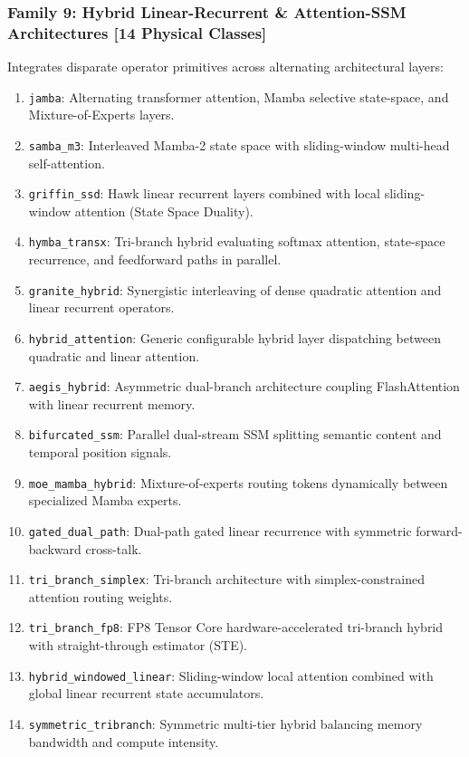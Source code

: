 \subsubsection{Family 9: Hybrid Linear-Recurrent \& Attention-SSM Architectures [14 Physical Classes]}
Integrates disparate operator primitives across alternating architectural layers:
\begin{enumerate}
    \item \texttt{jamba}: Alternating transformer attention, Mamba selective state-space, and Mixture-of-Experts layers.
    \item \texttt{samba\_m3}: Interleaved Mamba-2 state space with sliding-window multi-head self-attention.
    \item \texttt{griffin\_ssd}: Hawk linear recurrent layers combined with local sliding-window attention (State Space Duality).
    \item \texttt{hymba\_transx}: Tri-branch hybrid evaluating softmax attention, state-space recurrence, and feedforward paths in parallel.
    \item \texttt{granite\_hybrid}: Synergistic interleaving of dense quadratic attention and linear recurrent operators.
    \item \texttt{hybrid\_attention}: Generic configurable hybrid layer dispatching between quadratic and linear attention.
    \item \texttt{aegis\_hybrid}: Asymmetric dual-branch architecture coupling FlashAttention with linear recurrent memory.
    \item \texttt{bifurcated\_ssm}: Parallel dual-stream SSM splitting semantic content and temporal position signals.
    \item \texttt{moe\_mamba\_hybrid}: Mixture-of-experts routing tokens dynamically between specialized Mamba experts.
    \item \texttt{gated\_dual\_path}: Dual-path gated linear recurrence with symmetric forward-backward cross-talk.
    \item \texttt{tri\_branch\_simplex}: Tri-branch architecture with simplex-constrained attention routing weights.
    \item \texttt{tri\_branch\_fp8}: FP8 Tensor Core hardware-accelerated tri-branch hybrid with straight-through estimator (STE).
    \item \texttt{hybrid\_windowed\_linear}: Sliding-window local attention combined with global linear recurrent state accumulators.
    \item \texttt{symmetric\_tribranch}: Symmetric multi-tier hybrid balancing memory bandwidth and compute intensity.
\end{enumerate}

